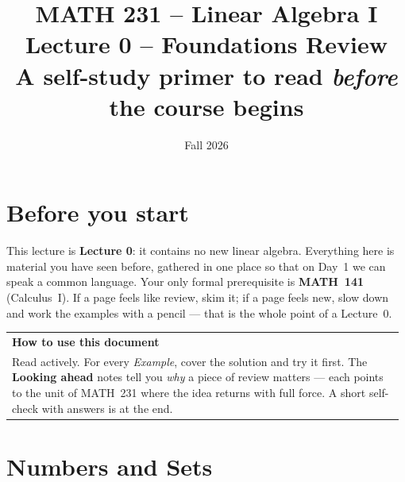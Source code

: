\documentclass[11pt]{article}
\title{\vspace{-1.2cm}\textbf{\sffamily MATH 231 -- Linear Algebra I}\\[4pt]
       {\large\sffamily Lecture 0 -- Foundations Review}\\[2pt]
       {\normalsize\sffamily A self-study primer to read \emph{before} the course begins}}
\author{}
\date{\normalsize\sffamily Fall 2026}
\makeatletter
\theoremstyle{definition}
\newcommand{\keybox}[2]{%
  \par\smallskip\noindent
  \begin{tabular}{@{}p{0.985\linewidth}@{}}
  \arrayrulecolor{RoyalBlue}\toprule
  {\sffamily\bfseries\color{RoyalBlue}#1}\\[2pt]#2\\
  \bottomrule
  \end{tabular}\par\smallskip}
\makeatother
\begin{document}
\maketitle
\vspace{-1.0cm}

\section*{Before you start}
This lecture is \textbf{Lecture 0}: it contains no new linear algebra. Everything
here is material you have seen before, gathered in one place so that on Day~1 we
can speak a common language. Your only formal prerequisite is \textbf{MATH~141}
(Calculus~I). If a page feels like review, skim it; if a page feels new, slow
down and work the examples with a pencil --- that is the whole point of a Lecture~0.

\keybox{How to use this document}{%
Read actively. For every \emph{Example}, cover the solution and try it first.
The \textcolor{BrickRed}{\textbf{\textsf{Looking ahead}}} notes tell you
\emph{why} a piece of review matters --- each points to the unit of MATH~231
where the idea returns with full force. A short self-check with answers is at the
end.}

\tableofcontents
\bigskip

\section{Numbers and Sets}
\end{document}
